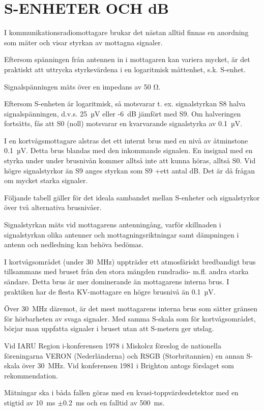 \chapter{S-ENHETER OCH dB}
\label{s-enhet}

I kommunikationsradiomottagare brukar det nästan alltid finnas en
anordning som mäter och visar styrkan av mottagna signaler.

Eftersom spänningen från antennen in i mottagaren kan variera mycket,
är det praktiskt att uttrycka styrkevärdena i en logaritmisk måttenhet,
s.k. S-enhet.

Signalspänningen mäts över en impedans av 50 Ω.

Eftersom S-enheten är logaritmisk, så motsvarar t. ex. signalstyrkan
S8 halva signalspänningen, d.v.s. 25~µV eller -6~dB jämfört med S9. Om
halveringen fortsätts, fås att S0 (noll) motsvarar en kvarvarande
signalstyrka av 0.1~µV.

I en kortvågsmottagare alstras det ett internt brus med en nivå av
åtminstone 0.1~µV.  Detta brus blandas med den inkommande signalen. En
insignal med en styrka under under brusnivån kommer alltså inte att
kunna höras, alltså S0. Vid högre signalstyrkor än S9 anges styrkan
som S9 +ett antal dB. Det är då frågan om mycket starka signaler.

Följande tabell gäller för det ideala sambandet mellan S-enheter och
signalstyrkor över två alternativa brusnivåer.

Signalstyrkan mäts vid mottagarens antenningång, varför skillnaden i
signalstyrkan olika antenner och mottagningsriktningar samt dämpningen
i antenn och nedledning kan behöva bedömas.

I kortvågsområdet (under 30~MHz) uppträder ett atmosfäriskt
bredbandigt brus tillsammans med bruset från den stora mängden
rundradio- m.fl. andra starka sändare.  Detta brus är mer dominerande
än mottagarens interna brus. I praktiken har de flesta KV-mottagare en
högre brusnivå än 0.1~µV.

Över 30~MHz däremot, är det mest mottagarens interna brus som sätter
gränsen för hörbarheten av svaga signaler. Med samma S-skala som för
kortvågsområdet, börjar man uppfatta signaler i bruset utan att
S-metern ger utslag.

Vid IARU Region i-konferensen 1978 i Miskolcz föreslog de nationella
föreningarna VERON (Nederländerna) och RSGB (Storbritannien) en annan
S-skala över 30~MHz.  Vid konferensen 1981 i Brighton antogs förslaget
som rekommendation.

Mätningar ska i båda fallen göras med en kvasi-toppvärdesdetektor
med en stigtid av 10~ms \(\pm\)0.2~ms och en falltid av 500~ms.

